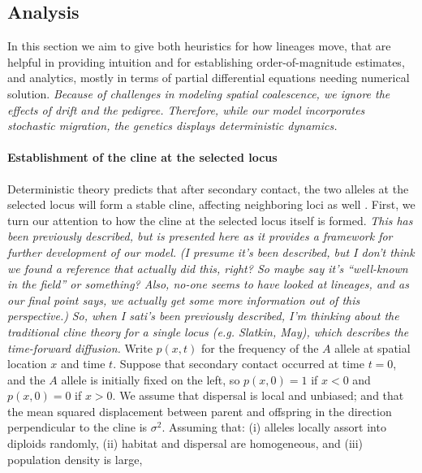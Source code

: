 \documentclass[11pt,letterpaper]{article}
\newcommand{\alisa}[1]{{\em \color{red} #1}}
\newcommand{\plr}[1]{{\em \color{blue} #1}}
\newcommand{\yb}[1]{{\em \color{magenta} #1}}
\begin{document}
\subsection*{Analysis}

In this section we aim to give both heuristics for how lineages move, 
that are helpful in providing intuition and for establishing order-of-magnitude estimates,
and analytics, mostly in terms of partial differential equations needing numerical solution. 
\yb{Because of challenges in modeling spatial coalescence, we ignore the effects of drift and the pedigree. 
Therefore, while our model incorporates stochastic migration, the genetics displays deterministic dynamics.}

\paragraph{Establishment of the cline at the selected locus}
Deterministic theory predicts that after secondary contact,
the two alleles at the selected locus will form a stable cline,
affecting neighboring loci as well \citep{barton1979gene, barton1986barrier}.
First, we turn our attention to how the cline at the selected locus itself is formed. 
\alisa{This has been previously described, but is presented here as it provides a framework for further development of our model.}
\plr{(I presume it's been described, but I don't think we found a reference that actually did this, right?  So maybe say it's ``well-known in the field'' or something?  Also, no-one seems to have looked at lineages, and as our final point says, we actually get some more information out of this perspective.)} \alisa{So, when I sati's been previously described, I'm thinking about the traditional cline theory for a single locus (e.g. Slatkin, May), which describes the time-forward diffusion.}
Write $p(x,t)$ for the frequency of the $A$ allele at spatial location $x$ and time $t$.  
Suppose that secondary contact occurred at time $t=0$, 
and the $A$ allele is initially fixed on the left, so
$p(x,0) = 1$ if $x<0$ and $p(x,0)=0$ if $x>0$.
We assume that dispersal is local and unbiased;
and that the mean squared displacement between parent and offspring
in the direction perpendicular to the cline
is $\sigma^2$.
Assuming that: (i) alleles locally assort into diploids randomly, 
(ii) habitat and dispersal are homogeneous,
and (iii) population density is large,
\end{document}
